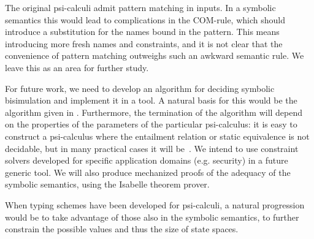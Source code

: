 \documentclass{eptcs}
\theoremstyle{definition}
\begin{document}
The original psi-calculi admit pattern matching in inputs. 
In a symbolic semantics this would lead to complications in the \textsc{COM}-rule,
which should introduce a substitution
for the names bound in the pattern. This means introducing
more fresh names and constraints, and it is not clear that the
convenience of pattern matching outweighs such an awkward semantic
rule. We leave this as an area for further study.

For future work, we need to develop an algorithm for deciding symbolic
bisimulation and implement it in a tool. A natural basis for this
would be the algorithm given in
\cite{hennessy.lin:symbolic-bisimulations}.
Furthermore, the termination of the algorithm will depend
on the properties of the parameters of the particular psi-calculus: it
is easy to construct a psi-calculus where the entailment relation or
static equivalence is
not decidable, but in many practical cases it will be~\cite{borgstroem:equivalences-calculi,baudet:thesis}.  
We intend to use constraint solvers developed for specific application
domains (e.g. security) in a future generic tool. We will also produce mechanized proofs of the adequacy of the symbolic
semantics, using the Isabelle theorem prover.


When typing schemes have been developed for psi-calculi,
a natural progression would be to take advantage of those also in the
symbolic semantics, to further constrain the possible values and thus the
size of state spaces.



\end{document}
